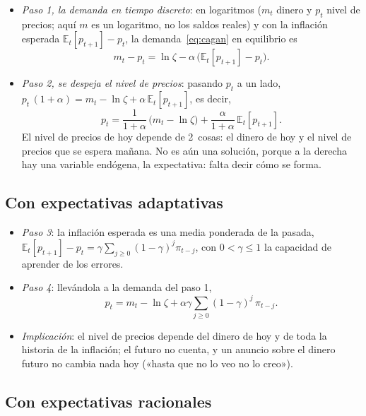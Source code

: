 \documentclass[11pt]{article}
\begin{document}
\begin{itemize}
\item \emph{Paso 1, la demanda en tiempo discreto}: en logaritmos ($m_t$ dinero y $p_t$ nivel de precios; aquí $m$ es un logaritmo, no los saldos reales) y con la inflación esperada $\mathbb{E}_t[p_{t+1}]-p_t$, la demanda~\eqref{eq:cagan} en equilibrio es\nocite{SargentWallace1973Rational}
  \begin{equation*}
  m_t-p_t=\ln\zeta-\alpha\,\big(\mathbb{E}_t[p_{t+1}]-p_t\big).
  \end{equation*}
\item \emph{Paso 2, se despeja el nivel de precios}: pasando $p_t$ a un lado, $p_t\,(1+\alpha)=m_t-\ln\zeta+\alpha\,\mathbb{E}_t[p_{t+1}]$, es decir,
  \begin{equation}\label{eq:cagan-precios}
  p_t=\frac{1}{1+\alpha}\,\big(m_t-\ln\zeta\big)+\frac{\alpha}{1+\alpha}\,\mathbb{E}_t[p_{t+1}].
  \end{equation}
  El nivel de precios de hoy depende de 2~cosas: el dinero de hoy y el nivel de precios que se espera mañana. No es aún una solución, porque a la derecha hay una variable endógena, la expectativa: falta decir cómo se forma.
\end{itemize}

\subsection{Con expectativas adaptativas}\label{anexo:cagan-hea}

\begin{itemize}
\item \emph{Paso 3}: la inflación esperada es una media ponderada de la pasada, $\mathbb{E}_t[p_{t+1}]-p_t=\gamma\sum_{j\geq0}(1-\gamma)^j\pi_{t-j}$, con $0<\gamma\leq1$ la capacidad de aprender de los errores.
\item \emph{Paso 4}: llevándola a la demanda del paso 1,
  \begin{equation*}
  p_t=m_t-\ln\zeta+\alpha\gamma\sum_{j\geq0}(1-\gamma)^j\,\pi_{t-j}.
  \end{equation*}
\item \emph{Implicación}: el nivel de precios depende del dinero de hoy y de toda la historia de la inflación; el futuro no cuenta, y un anuncio sobre el dinero futuro no cambia nada hoy («hasta que no lo veo no lo creo»).
\end{itemize}

\subsection{Con expectativas racionales}\label{anexo:cagan-her}
\end{document}
